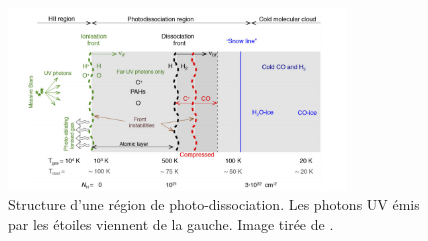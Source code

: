 \documentclass[11pt,a4paper]{article}
\begin{document}
\begin{spacing}{0.98}
\begin{figure}[!h]
    \centering
    \includegraphics[width = 0.8\textwidth]{figure/structurepdr.pdf}
    \caption{Structure d'une région de photo-dissociation. Les photons UV émis par les étoiles viennent de la gauche. Image tirée de \cite{Goicoechea2016}.}
    \label{fig:intro:struct}
\end{figure}
 \newline


\end{spacing}
\end{document}

